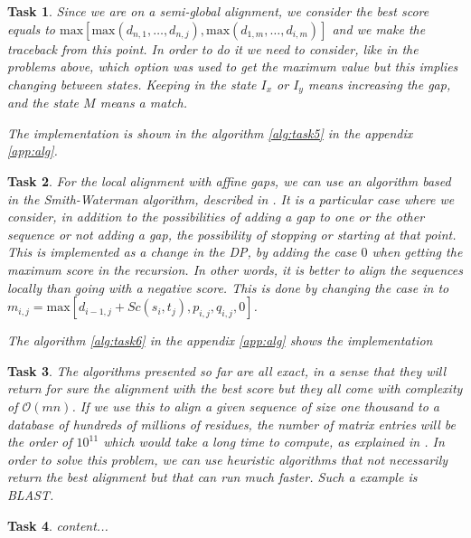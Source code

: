 \documentclass[11pt]{article} %
\theoremstyle{problemstyle}
\newtheorem{exercise}{Task}	%
\renewcommand*{\O}{\mathcal{O}}
\begin{document}
\begin{exercise}
\begin{sloppypar}
Since we are on a semi-global alignment, we consider the best score equals to ${\text{max}[\text{max}(d_{n,1},\dots,d_{n,j}),\text{max}(d_{1,m},\dots ,d_{i,m})]}$ and we make the traceback from this point. In order to do it we need to consider, like in the problems above, which option was used to get the maximum value but this implies changing between states. Keeping in the state $I_x$ or $I_y$ means increasing the gap, and the state $M$ means a match.
\end{sloppypar}

The implementation is shown in the algorithm \ref{alg:task5} in the appendix \ref{app:alg}.

\end{exercise}

\begin{exercise} %
For the local alignment with affine gaps, we can use an algorithm based in the Smith-Waterman algorithm, described in \cite{durbin}. It is a particular case where we consider, in addition to the possibilities of adding a gap to one or the other sequence or not adding a gap, the possibility of stopping or starting at that point. This is implemented as a change in the DP, by adding the case $0$ when getting the maximum score in the recursion. In other words, it is better to align the sequences locally than going with a negative score. This is done by changing the case in  to ${m_{i,j}=\text{max}[d_{i-1,j}+Sc(s_i,t_j), p_{i,j}, q_{i,j},0]}$.

The algorithm \ref{alg:task6} in the appendix \ref{app:alg} shows the implementation

\end{exercise}

\begin{exercise} %
The algorithms presented so far are all exact, in a sense that they will return for sure the alignment with the best score but they all come with complexity of $\O(mn)$. If we use this to align a given sequence of size one thousand to a database of hundreds of millions of residues, the number of matrix entries will be the order of $10^{11}$ which would take a long time to compute, as explained in \cite{durbin}. In order to solve this problem, we can use heuristic algorithms that not necessarily return the best alignment but that can run much faster. Such a example is BLAST.
\end{exercise}

\begin{exercise} %
	content...
\end{exercise}
\end{document}
